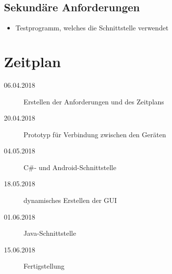 \documentclass{scrartcl}
\begin{document}
\subsection{Sekundäre Anforderungen}
\begin{itemize}
	\item Testprogramm, welches die Schnittstelle verwendet
\end{itemize}
\section{Zeitplan}
\begin{description}
	\item[06.04.2018] Erstellen der Anforderungen und des Zeitplans
	\item[20.04.2018] Prototyp für Verbindung zwischen den Geräten
	\item[04.05.2018] C\#- und Android-Schnittstelle
	\item[18.05.2018] dynamisches Erstellen der GUI
	\item[01.06.2018] Java-Schnittstelle
	\item[15.06.2018] Fertigstellung
\end{description}
\end{document}
